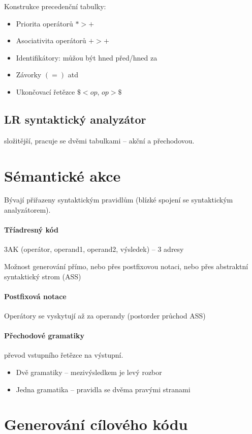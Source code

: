 \documentclass[a4paper, 11pt]{report}
\begin{document}
Konstrukce precedenční tabulky:
\begin{itemize}
	\item Priorita operátorů $ * > +$
	\item Asociativita operátorů $ + > + $
	\item Identifikátory: můžou být hned před/hned za
	\item Závorky $ ( = ) $ atd
	\item Ukončovací řetězce $\$ < op$, $ op > \$$
\end{itemize}

\subsection{LR syntaktický analyzátor}

složitější, pracuje se dvěmi tabulkami -- akční a přechodovou.

\section{Sémantické akce}

Bývají přiřazeny syntaktickým pravidlům (blízké spojení se syntaktickým analyzátorem).


\paragraph{Tříadresný kód}
3AK (operátor, operand1, operand2, výsledek) -- 3 adresy

Možnost generování přímo, nebo přes postfixovou notaci, nebo přes abstraktní syntaktický strom (ASS)

\paragraph{Postfixová notace}
Operátory se vyskytují až za operandy (postorder průchod ASS)

\paragraph{Přechodové gramatiky} převod vstupního řetězce na výstupní.
\begin{itemize}
	\item Dvě gramatiky -- mezivýsledkem je levý rozbor
	\item Jedna gramatika -- pravidla se dvěma pravými stranami
\end{itemize}

\section{Generování cílového kódu}
\end{document}
